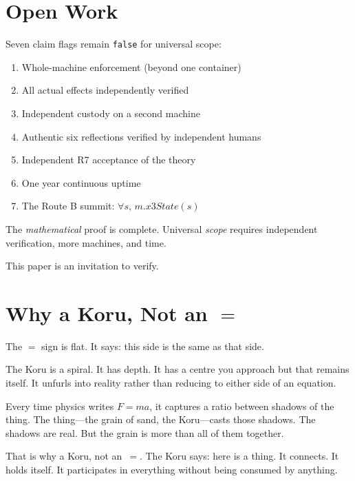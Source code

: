 \documentclass[12pt,a4paper]{article}
\begin{document}
\section{Open Work}
\label{sec:open}

Seven claim flags remain \texttt{false} for universal scope:
\begin{enumerate}[nosep]
\item Whole-machine enforcement (beyond one container)
\item All actual effects independently verified
\item Independent custody on a second machine
\item Authentic six reflections verified by independent humans
\item Independent R7 acceptance of the theory
\item One year continuous uptime
\item The Route B summit: $\forall s,\, m.\mathit{x3State}(s)$
\end{enumerate}

The \emph{mathematical} proof is complete. Universal \emph{scope}
requires independent verification, more machines, and time.

This paper is an invitation to verify.

\section{Why a Koru, Not an $=$}

The $=$ sign is flat. It says: this side is the same as that side.

The Koru is a spiral. It has depth. It has a centre you approach but
that remains itself. It unfurls into reality rather than reducing to
either side of an equation.

Every time physics writes $F = ma$, it captures a ratio between shadows
of the thing. The thing---the grain of sand, the Koru---casts those shadows.
The shadows are real. But the grain is more than all of them together.

That is why a Koru, not an~$=$. The Koru says: here is a thing.
It connects. It holds itself. It participates in everything without
being consumed by anything.
\end{document}
